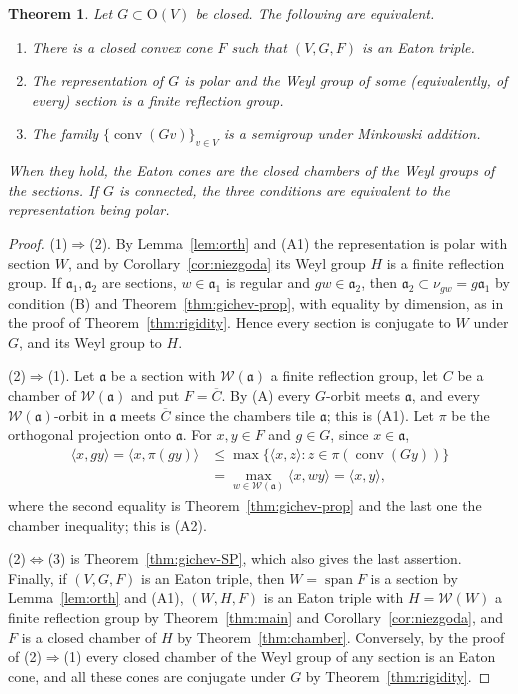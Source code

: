 \documentclass[11pt]{amsart}
\theoremstyle{plain}
\newtheorem{theorem}{Theorem}[section]
\theoremstyle{definition}
\theoremstyle{remark}
\newcommand{\fa}{\mathfrak a}
\newcommand{\ip}[2]{\langle #1,#2\rangle}
\newcommand{\conv}{\operatorname{conv}}
\newcommand{\spn}{\operatorname{span}}
\begin{document}
\begin{theorem}\label{thm:char}
Let $G\subset \mathrm{O}(V)$ be closed. The following are equivalent.
\begin{enumerate}
\item There is a closed convex cone $F$ such that $(V,G,F)$ is an Eaton triple.
\item The representation of $G$ is polar and the Weyl group of some (equivalently, of every) section is a finite reflection group.
\item The family $\{\conv(Gv)\}_{v\in V}$ is a semigroup under Minkowski addition.
\end{enumerate}
When they hold, the Eaton cones are the closed chambers of the Weyl groups of the sections. If $G$ is connected, the three conditions are equivalent to the representation being polar.
\end{theorem}
\begin{proof}
(1)$\Rightarrow$(2). By Lemma~\ref{lem:orth} and (A1) the representation is polar with section $W$, and by Corollary~\ref{cor:niezgoda} its Weyl group $H$ is a finite reflection group. If $\fa_1,\fa_2$ are sections, $w\in\fa_1$ is regular and $gw\in\fa_2$, then $\fa_2\subset\nu_{gw}=g\fa_1$ by condition (B) and Theorem~\ref{thm:gichev-prop}, with equality by dimension, as in the proof of Theorem~\ref{thm:rigidity}. Hence every section is conjugate to $W$ under $G$, and its Weyl group to $H$.

(2)$\Rightarrow$(1). Let $\fa$ be a section with $\mathcal W(\fa)$ a finite reflection group, let $C$ be a chamber of $\mathcal W(\fa)$ and put $F=\overline C$. By (A) every $G$-orbit meets $\fa$, and every $\mathcal W(\fa)$-orbit in $\fa$ meets $\overline C$ since the chambers tile $\fa$; this is (A1). Let $\pi$ be the orthogonal projection onto $\fa$. For $x,y\in F$ and $g\in G$, since $x\in\fa$,
\begin{align*}
\ip{x}{gy}=\ip{x}{\pi(gy)}&\le\max\{\ip{x}{z}: z\in\pi(\conv(Gy))\}\\
&=\max_{w\in \mathcal W(\fa)}\ip{x}{wy}=\ip{x}{y},
\end{align*}
where the second equality is Theorem~\ref{thm:gichev-prop} and the last one the chamber inequality; this is (A2).

(2)$\Leftrightarrow$(3) is Theorem~\ref{thm:gichev-SP}, which also gives the last assertion. Finally, if $(V,G,F)$ is an Eaton triple, then $W=\spn F$ is a section by Lemma~\ref{lem:orth} and (A1), $(W,H,F)$ is an Eaton triple with $H=\mathcal W(W)$ a finite reflection group by Theorem~\ref{thm:main} and Corollary~\ref{cor:niezgoda}, and $F$ is a closed chamber of $H$ by Theorem~\ref{thm:chamber}. Conversely, by the proof of (2)$\Rightarrow$(1) every closed chamber of the Weyl group of any section is an Eaton cone, and all these cones are conjugate under $G$ by Theorem~\ref{thm:rigidity}.
\end{proof}
\end{document}
